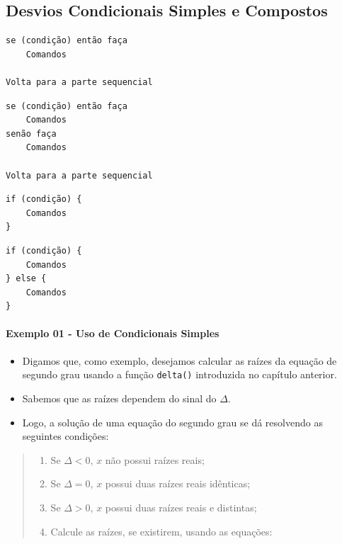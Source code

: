 \documentclass[12pt,a4paper]{article}
\providecommand{\tightlist}{%
      \setlength{\itemsep}{0pt}\setlength{\parskip}{0pt}}
\begin{document}
    \hypertarget{desvios-condicionais-simples-e-compostos}{%
\subsection{Desvios Condicionais Simples e
Compostos}\label{desvios-condicionais-simples-e-compostos}}

    \begin{verbatim}
se (condição) então faça 
    Comandos

Volta para a parte sequencial
\end{verbatim}

\begin{verbatim}
se (condição) então faça 
    Comandos
senão faça 
    Comandos

Volta para a parte sequencial
\end{verbatim}

    \begin{verbatim}
if (condição) {
    Comandos
}
\end{verbatim}

\begin{verbatim}
if (condição) {
    Comandos
} else {
    Comandos
}
\end{verbatim}

    \hypertarget{exemplo-01---uso-de-condicionais-simples}{%
\paragraph{Exemplo 01 - Uso de Condicionais
Simples}\label{exemplo-01---uso-de-condicionais-simples}}

    \begin{itemize}
\item
  Digamos que, como exemplo, desejamos calcular as raízes da equação de
  segundo grau usando a função \texttt{delta()} introduzida no capítulo
  anterior.
\item
  Sabemos que as raízes dependem do sinal do \(\Delta\).
\item
  Logo, a solução de uma equação do segundo grau se dá resolvendo as
  seguintes condições:
\end{itemize}

\begin{quote}
\begin{enumerate}
\def\labelenumi{\arabic{enumi}.}
\tightlist
\item
  Se \(\Delta<0\), \(x\) não possui raízes reais;
\item
  Se \(\Delta=0\), \(x\) possui duas raízes reais idênticas;
\item
  Se \(\Delta>0\), \(x\) possui duas raízes reais e distintas;
\item
  Calcule as raízes, se existirem, usando as equações:
\end{enumerate}
\end{quote}
\end{document}
